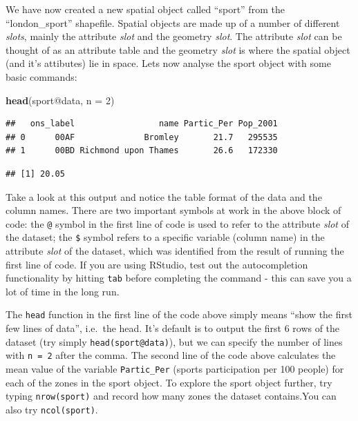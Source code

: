 \documentclass[]{article}
\newenvironment{Shaded}{}{}
\newcommand{\KeywordTok}[1]{\textcolor[rgb]{0.00,0.44,0.13}{\textbf{{#1}}}}
\newcommand{\DataTypeTok}[1]{\textcolor[rgb]{0.56,0.13,0.00}{{#1}}}
\newcommand{\DecValTok}[1]{\textcolor[rgb]{0.25,0.63,0.44}{{#1}}}
\newcommand{\NormalTok}[1]{{#1}}
\begin{document}
We have now created a new spatial object called ``sport'' from the
``london\_sport'' shapefile. Spatial objects are made up of a number of
different \emph{slots}, mainly the attribute \emph{slot} and the
geometry \emph{slot}. The attribute \emph{slot} can be thought of as an
attribute table and the geometry \emph{slot} is where the spatial object
(and it's attibutes) lie in space. Lets now analyse the sport object
with some basic commands:

\begin{Shaded}
\begin{Highlighting}[]
\KeywordTok{head}\NormalTok{(sport@data, }\DataTypeTok{n =} \DecValTok{2}\NormalTok{)}
\end{Highlighting}
\end{Shaded}
\begin{verbatim}
##   ons_label                 name Partic_Per Pop_2001
## 0      00AF              Bromley       21.7   295535
## 1      00BD Richmond upon Thames       26.6   172330
\end{verbatim}
\begin{Shaded}
\end{Shaded}
\begin{verbatim}
## [1] 20.05
\end{verbatim}
Take a look at this output and notice the table format of the data and
the column names. There are two important symbols at work in the above
block of code: the \texttt{@} symbol in the first line of code is used
to refer to the attribute \emph{slot} of the dataset; the \texttt{\$}
symbol refers to a specific variable (column name) in the attribute
\emph{slot} of the dataset, which was identified from the result of
running the first line of code. If you are using RStudio, test out the
autocompletion functionality by hitting \texttt{tab} before completing
the command - this can save you a lot of time in the long run.

The \texttt{head} function in the first line of the code above simply
means ``show the first few lines of data'', i.e.~the head. It's default
is to output the first 6 rows of the dataset (try simply
\texttt{head(sport@data)}), but we can specify the number of lines with
\texttt{n = 2} after the comma. The second line of the code above
calculates the mean value of the variable \texttt{Partic\_Per} (sports
participation per 100 people) for each of the zones in the sport object.
To explore the sport object further, try typing \texttt{nrow(sport)} and
record how many zones the dataset contains.You can also try
\texttt{ncol(sport)}.
\end{document}
